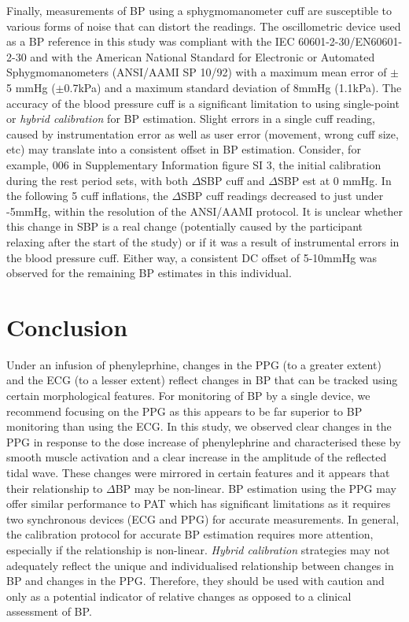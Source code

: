 \documentclass[fleqn,10pt]{wlscirep}
\begin{document}
Finally, measurements of BP using a sphygmomanometer cuff are susceptible to various forms of noise that can distort the readings. The oscillometric device used as a BP reference in this study was compliant with the IEC 60601-2-30/EN60601-2-30 and with the American National Standard for Electronic or Automated Sphygmomanometers (ANSI/AAMI SP 10/92) \cite{Stergiou2018} with a maximum mean error of $\pm$5 mmHg ($\pm$0.7kPa) and a maximum standard deviation of 8mmHg (1.1kPa). The accuracy of the blood pressure cuff is a significant limitation to using single-point or \textit{hybrid calibration} for BP estimation. Slight errors in a single cuff reading, caused by instrumentation error as well as user error (movement, wrong cuff size, etc) may translate into a consistent offset in BP estimation. Consider, for example, 006 in Supplementary Information figure SI 3, the initial calibration during the rest period sets, with both $\Delta$SBP cuff and $\Delta$SBP est at 0 mmHg. In the following 5 cuff inflations, the $\Delta$SBP cuff readings decreased to just under -5mmHg, within the resolution of the ANSI/AAMI protocol. It is unclear whether this change in SBP is a real change (potentially caused by the participant relaxing after the start of the study) or if it was a result of instrumental errors in the blood pressure cuff. Either way, a consistent DC offset of 5-10mmHg was observed for the remaining BP estimates in this individual. 


\section{Conclusion}

Under an infusion of phenyleprhine, changes in the PPG (to a greater extent) and the ECG (to a lesser extent) reflect changes in BP that can be tracked using certain morphological features. For monitoring of BP by a single device, we recommend focusing on the PPG as this appears to be far superior to BP monitoring than using the ECG. In this study, we observed clear changes in the PPG in response to the dose increase of phenylephrine and characterised these by smooth muscle activation and a clear increase in the amplitude of the reflected tidal wave. These changes were mirrored in certain features and it appears that their relationship to $\Delta$BP may be non-linear. BP estimation using the PPG may offer similar performance to PAT which has significant limitations as it requires two synchronous devices (ECG and PPG) for accurate measurements. In general, the calibration protocol for accurate BP estimation requires more attention, especially if the relationship is non-linear. \textit{Hybrid calibration} strategies may not adequately reflect the unique and individualised relationship between changes in BP and changes in the PPG. Therefore, they should be used with caution and only as a potential indicator of relative changes as opposed to a clinical assessment of BP.
\end{document}
